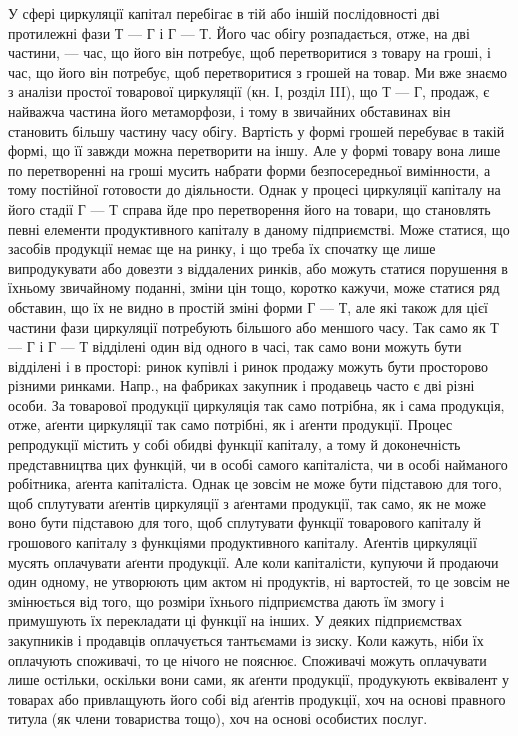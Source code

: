 У сфері циркуляції капітал перебігає в тій або іншій послідовності
дві протилежні фази Т — Г і Г — Т. Його час обігу розпадається, отже,
на дві частини, — час, що його він потребує, щоб перетворитися з товару
на гроші, і час, що його він потребує, щоб перетворитися з грошей на
товар. Ми вже знаємо з аналізи простої товарової циркуляції (кн. І,
розділ III), що Т — Г, продаж, є найважча частина його метаморфози,
і тому в звичайних обставинах він становить більшу частину часу
обігу. Вартість у формі грошей перебуває в такій формі, що її завжди
можна перетворити на іншу. Але у формі товару вона лише по перетворенні
на гроші мусить набрати форми безпосередньої вимінности,
а тому постійної готовости до діяльности. Однак у процесі циркуляції
капіталу на його стадії Г — Т справа йде про перетворення його на
товари, що становлять певні елементи продуктивного капіталу в даному
підприємстві. Може статися, що засобів продукції немає ще на ринку, і
що треба їх спочатку ще лише випродукувати або довезти з віддалених
ринків, або можуть статися порушення в їхньому звичайному поданні,
зміни цін тощо, коротко кажучи, може статися ряд обставин, що
їх не видно в простій зміні форми Г — Т, але які також для цієї частини
фази циркуляції потребують більшого або меншого часу. Так само як
Т — Г і Г — Т відділені один від одного в часі, так само вони можуть
бути відділені і в просторі: ринок купівлі і ринок продажу можуть бути
просторово різними ринками. Напр., на фабриках закупник і продавець
часто є дві різні особи. За товарової продукції циркуляція так само
потрібна, як і сама продукція, отже, аґенти циркуляції так само потрібні,
як і аґенти продукції. Процес репродукції містить у собі обидві функції
капіталу, а тому й доконечність представництва цих функцій, чи в особі
самого капіталіста, чи в особі найманого робітника, аґента капіталіста.
Однак це зовсім не може бути підставою для того, щоб сплутувати
аґентів циркуляції з аґентами продукції, так само, як не може воно
бути підставою для того, щоб сплутувати функції товарового капіталу
й грошового капіталу з функціями продуктивного капіталу. Аґентів циркуляції
мусять оплачувати аґенти продукції. Але коли капіталісти, купуючи
й продаючи один одному, не утворюють цим актом ні продуктів, ні
вартостей, то це зовсім не змінюється від того, що розміри їхнього
підприємства дають їм змогу і примушують їх перекладати ці функції на
інших. У деяких підприємствах закупників і продавців оплачується
тантьємами із зиску. Коли кажуть, ніби їх оплачують споживачі, то це
нічого не пояснює. Споживачі можуть оплачувати лише остільки, оскільки
вони сами, як аґенти продукції, продукують еквівалент у товарах або
привлащують його собі від аґентів продукції, хоч на основі правного титула
(як члени товариства тощо), хоч на основі особистих послуг.

